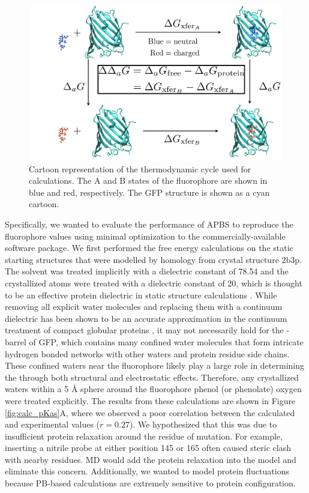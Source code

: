 \begin{figure}
    \center
    \includegraphics[width=\single]{figures-gfp-pKa/thermocycle.png}
    \caption[Schematic of the thermodynamic cycle used for \pKa{} calculuations]{
        Cartoon representation of the thermodynamic cycle used for \pKa{} calculations. 
        The A and B states of the fluorophore are shown in blue and red, respectively. 
        The GFP structure is shown as a cyan cartoon.
    }
    \label{fig:thermocycle}
\end{figure}

Specifically, we wanted to evaluate the performance of APBS to reproduce the fluorophore \pKa{} values using minimal optimization to the commercially-available software package. 
We first performed the free energy calculations on the static starting structures that were modelled by homology from crystal structure 2b3p. 
The solvent was treated implicitly with a dielectric constant of 78.54 and the crystallized atoms were treated with a dielectric constant of 20, which is thought to be an effective protein dielectric in static structure calculations \cite{Mehler1999}.
While removing all explicit water molecules and replacing them with a continuum dielectric has been shown to be an accurate approximation in the continuum treatment of compact globular proteins \cite{Kukic2013, Simonson1996}, it may not necessarily hold for the \textbeta{}-barrel of GFP, which contains many confined water molecules that form intricate hydrogen bonded networks with other waters and protein residue side chains. These confined waters near the fluorophore likely play a large role in determining the \pKa{} through both structural and electrostatic effects.
Therefore, any crystallized waters within a 5 \si{\angstrom} sphere around the fluorophore phenol (or phenolate) oxygen were treated explicitly.
The results from these calculations are shown in Figure \ref{fig:calc_pKas}A, where we observed a poor correlation between the calculated and experimental \pKa{} values ($r = 0.27$).
We hypothesized that this was due to insufficient protein relaxation around the residue of mutation.
For example, inserting a nitrile probe at either position 145 or 165 often caused steric clash with nearby residues.
MD would add the protein relaxation into the model and eliminate this concern.
Additionally, we wanted to model protein fluctuations because PB-based calculations are extremely sensitive to protein configuration.

